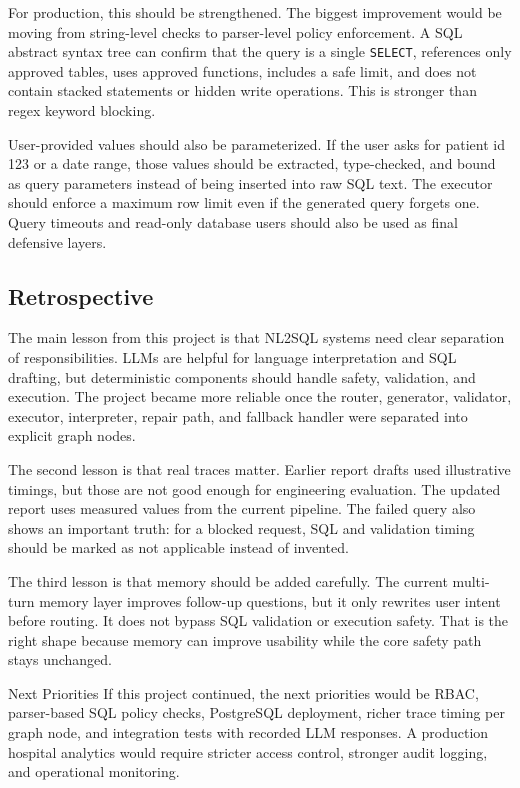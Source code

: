 \documentclass[11pt,a4paper]{article}
\begin{document}
For production, this should be strengthened. The biggest improvement would be moving from string-level checks to parser-level policy enforcement. A SQL abstract syntax tree can confirm that the query is a single \texttt{SELECT}, references only approved tables, uses approved functions, includes a safe limit, and does not contain stacked statements or hidden write operations. This is stronger than regex keyword blocking.

User-provided values should also be parameterized. If the user asks for patient id 123 or a date range, those values should be extracted, type-checked, and bound as query parameters instead of being inserted into raw SQL text. The executor should enforce a maximum row limit even if the generated query forgets one. Query timeouts and read-only database users should also be used as final defensive layers.

\subsection{Retrospective}

The main lesson from this project is that NL2SQL systems need clear separation of responsibilities. LLMs are helpful for language interpretation and SQL drafting, but deterministic components should handle safety, validation, and execution. The project became more reliable once the router, generator, validator, executor, interpreter, repair path, and fallback handler were separated into explicit graph nodes.

The second lesson is that real traces matter. Earlier report drafts used illustrative timings, but those are not good enough for engineering evaluation. The updated report uses measured values from the current pipeline. The failed query also shows an important truth: for a blocked request, SQL and validation timing should be marked as not applicable instead of invented.

The third lesson is that memory should be added carefully. The current multi-turn memory layer improves follow-up questions, but it only rewrites user intent before routing. It does not bypass SQL validation or execution safety. That is the right shape because memory can improve usability while the core safety path stays unchanged.

\begin{summarybox}{Next Priorities}
If this project continued, the next priorities would be RBAC, parser-based SQL policy checks, PostgreSQL deployment, richer trace timing per graph node, and integration tests with recorded LLM responses. A production hospital analytics would require stricter access control, stronger audit logging, and operational monitoring.
\end{summarybox}
\end{document}
